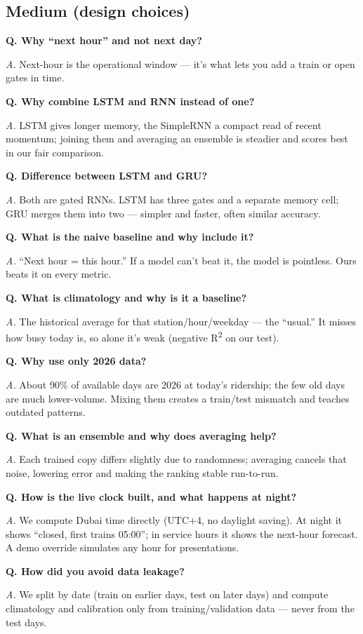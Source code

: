 \documentclass[11pt]{article}
\newcommand{\q}[1]{\medskip\noindent\textbf{Q. #1}\par\nopagebreak}
\newcommand{\an}[1]{\noindent\textit{A.} #1\par}
\begin{document}
\subsection{Medium (design choices)}
\q{Why ``next hour'' and not next day?}
\an{Next-hour is the operational window --- it's what lets you add a train or open gates in time.}
\q{Why combine LSTM and RNN instead of one?}
\an{LSTM gives longer memory, the SimpleRNN a compact read of recent momentum; joining them and
averaging an ensemble is steadier and scores best in our fair comparison.}
\q{Difference between LSTM and GRU?}
\an{Both are gated RNNs. LSTM has three gates and a separate memory cell; GRU merges them into two ---
simpler and faster, often similar accuracy.}
\q{What is the naive baseline and why include it?}
\an{``Next hour = this hour.'' If a model can't beat it, the model is pointless. Ours beats it on every metric.}
\q{What is climatology and why is it a baseline?}
\an{The historical average for that station/hour/weekday --- the ``usual.'' It misses how busy today
is, so alone it's weak (negative R\textsuperscript{2} on our test).}
\q{Why use only 2026 data?}
\an{About 90\% of available days are 2026 at today's ridership; the few old days are much lower-volume.
Mixing them creates a train/test mismatch and teaches outdated patterns.}
\q{What is an ensemble and why does averaging help?}
\an{Each trained copy differs slightly due to randomness; averaging cancels that noise, lowering error
and making the ranking stable run-to-run.}
\q{How is the live clock built, and what happens at night?}
\an{We compute Dubai time directly (UTC$+$4, no daylight saving). At night it shows ``closed, first
trains 05:00''; in service hours it shows the next-hour forecast. A demo override simulates any hour
for presentations.}
\q{How did you avoid data leakage?}
\an{We split by date (train on earlier days, test on later days) and compute climatology and
calibration only from training/validation data --- never from the test days.}
\end{document}
